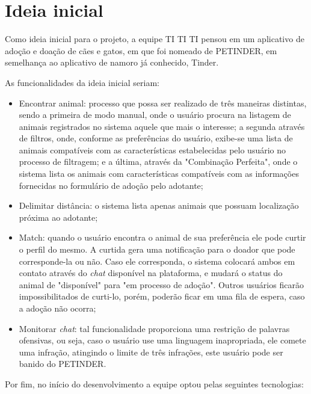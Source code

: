 \section{Ideia inicial}
Como ideia inicial para o projeto, a equipe TI TI TI pensou em um aplicativo de adoção e doação de cães e gatos, em que foi nomeado de PETINDER, em semelhança ao aplicativo de namoro já conhecido, \gls{Tinder}. 

As funcionalidades da ideia inicial seriam:

\begin{itemize}

\item Encontrar animal: processo que possa ser realizado de três maneiras distintas, sendo a primeira de modo manual, onde o usuário procura na listagem de animais registrados no sistema aquele que mais o interesse; a segunda através de filtros, onde, conforme as preferências do usuário, exibe-se uma lista de animais compatíveis com as características estabelecidas pelo usuário no processo de filtragem; e a última, através da "Combinação Perfeita", onde o sistema lista os animais com características compatíveis com as informações fornecidas no formulário de adoção pelo adotante;

\item Delimitar distância: o sistema lista apenas animais que possuam localização próxima ao adotante;

\item \gls{Match}: quando o usuário encontra o animal de sua preferência ele pode curtir o perfil do mesmo. A curtida gera uma notificação para o doador que pode corresponde-la ou não. Caso ele corresponda, o sistema colocará ambos em contato através do \textit{chat} disponível na plataforma, e mudará o status do animal de "disponível" \space para "em processo de adoção". Outros usuários ficarão impossibilitados de curti-lo, porém, poderão ficar em uma fila de espera, caso a adoção não ocorra;

\item Monitorar \textit{chat}: tal funcionalidade proporciona uma restrição de palavras ofensivas, ou seja, caso  o usuário use uma linguagem inapropriada, ele comete uma infração, atingindo o limite de três infrações, este usuário pode ser banido do PETINDER.

\end{itemize}

Por fim, no início do desenvolvimento a equipe optou pelas seguintes tecnologias: 

